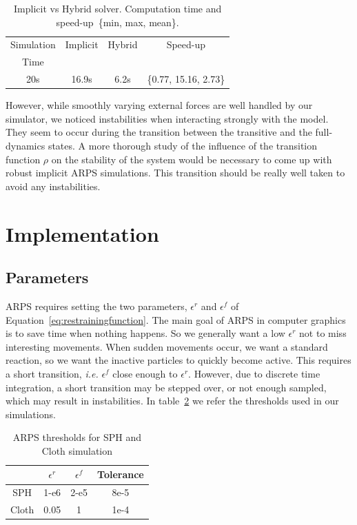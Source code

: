 \begin{table}[!h]
	\centering
	\begin{tabular}{|c|c|c|c|} \hline
		Simulation & Implicit  & Hybrid    & Speed-up \\
		Time & & & \\ \hline
		20s             & 16.9s     & 6.2s      &  \{0.77, 15.16, 2.73\}\\ \hline
	\end{tabular}
	\caption[ARPS: Implicit vs. Hybrid solver - Measurements]{\label{tab:clothePerf}Implicit vs Hybrid solver. Computation time and speed-up~\small{\{min, max, mean\}.}}
\end{table}

However, while smoothly varying external forces are well handled by our simulator, we noticed instabilities when interacting strongly with the model.
They seem to occur during the transition between the transitive and the full-dynamics states.
A more thorough study of the influence of the transition function $\rho$ on the stability of the system would be necessary to come up with robust implicit ARPS simulations.
 This transition should be really well taken to avoid any instabilities.

\section{Implementation} 
\label{sec:arps_implementation}

\subsection{ Parameters }
ARPS requires setting the two parameters, $\epsilon^{r}$ and $\epsilon^{f}$ of Equation~\ref{eq:restrainingfunction}.
The main goal of ARPS in computer graphics is to save time when nothing happens.
So we generally want a low $\epsilon^{r}$ not to miss interesting movements.
When sudden movements occur, we want a standard reaction, so we want the inactive particles to quickly become active.
This requires a short transition, \textit{i.e.} $\epsilon^{f}$ close enough to $\epsilon^{r}$.
However, due to discrete time integration, a short transition may be stepped over, or not enough sampled, which may result in instabilities.
In table~\ref{tab:parameters} we refer the thresholds used in our simulations.

\begin{table}[!h]
    \centering
    \begin{tabular}{|c|c|c|c|} \hline
                & $\epsilon^{r}$    & $\epsilon^{f}$ & Tolerance \\ \hline
        SPH     &   1-e6            & 2-e5          & 8e-5 \\ \hline
        Cloth  &   0.05            & 1             & 1e-4 \\ \hline
\end{tabular}
    \caption[ARPS: Parameters for ARPS solver]{\label{tab:parameters} ARPS thresholds for SPH and Cloth simulation}
\end{table}

